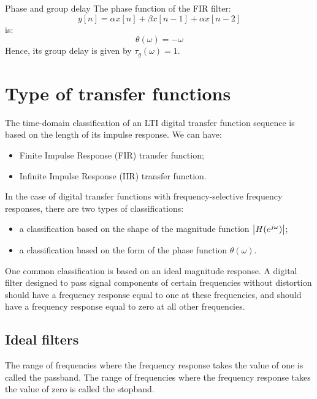 \documentclass[../../main/main.tex]{subfiles}
\begin{document}
\begin{example}{Phase and group delay}{}
    The phase function of the FIR filter:
    \begin{equation}
        y[n]
        =
        \alpha x[n] + \beta x[n-1] + \alpha x[n-2]
        \label{eq:L17_S22_1}
    \end{equation}
    is:
    \begin{equation}
        \theta(\omega)
        =
        - \omega
        \label{eq:L17_S22_2}
    \end{equation}
    Hence, its group delay is given by \( \tau_{g}(\omega) = 1 \).
\end{example}





\section{Type of transfer functions}
The time-domain classification of an LTI digital transfer function sequence is based on the length of its impulse response. We can have:
\begin{itemize}
    \item Finite Impulse Response (FIR) transfer function;
    \item Infinite Impulse Response (IIR) transfer function.
\end{itemize}
In the case of digital transfer functions with frequency-selective frequency responses, there are two types of classifications:
\begin{itemize}
    \item a classification based on the shape of the magnitude function \( \abs{H(e^{j\omega})} \);
    \item a classification based on the form of the phase function \( \theta(\omega) \).
\end{itemize}
One common classification is based on an ideal magnitude response. A digital filter designed to pass signal components of certain frequencies without distortion should have a frequency response equal to one at these frequencies, and should have a frequency response equal to zero at all other frequencies.



\subsection{Ideal filters}
The range of frequencies where the frequency response takes the value of one is called the passband. The range of frequencies where the frequency response takes the value of zero is called the stopband.
\end{document}
